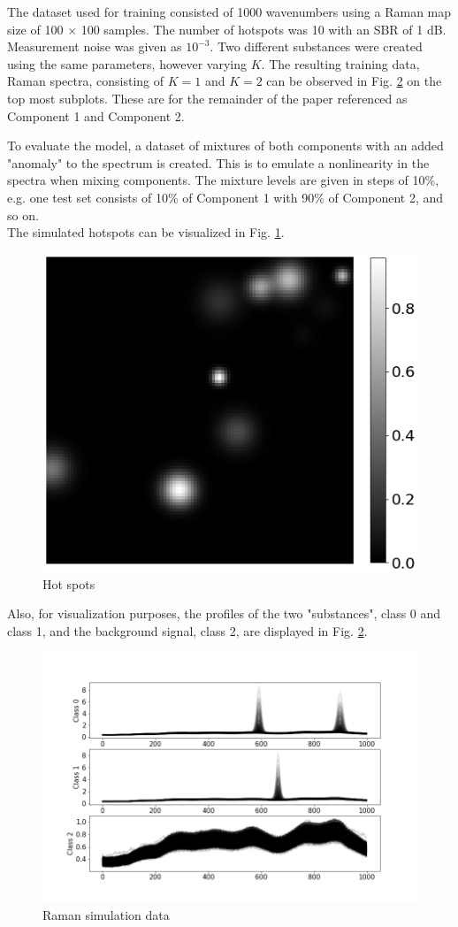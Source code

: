 \documentclass{article}
\begin{document}
The dataset used for training consisted of 1000 wavenumbers using a Raman map size of 100 $\times$ 100 samples. The number of hotspots was 10 with an SBR of 1 dB. Measurement noise was given as $10^{-3}$. Two different substances were created using the same parameters, however varying $K$. The resulting training data, Raman spectra, consisting of $K=1$ and $K=2$ can be observed in Fig. \ref{fig:raman} on the top most subplots. These are for the remainder of the paper referenced as Component 1 and Component 2.

To evaluate the model, a dataset of mixtures of both components with an added "anomaly" to the spectrum is created. This is to emulate a nonlinearity in the spectra when mixing components. The mixture levels are given in steps of 10\%, e.g. one test set consists of 10\% of Component 1 with 90\% of Component 2, and so on.\\
The simulated hotspots can be visualized in Fig. \ref{fig:hotspots}.

\begin{figure}[H]
    \centering
\includegraphics[width=0.5\linewidth]{figures_3/raman_sim_hotspots.png}  
\caption{Hot spots}
\label{fig:hotspots}
\end{figure}

Also, for visualization purposes, the profiles of the two "substances", class 0 and class 1, and the background signal, class 2, are displayed in Fig. \ref{fig:raman}.

\begin{figure}[H]
	\centering
	\includegraphics[width=1\linewidth]{raman_sim_training_data_2.png}  
	\caption{Raman simulation data}
	\label{fig:raman}
\end{figure}
\end{document}
